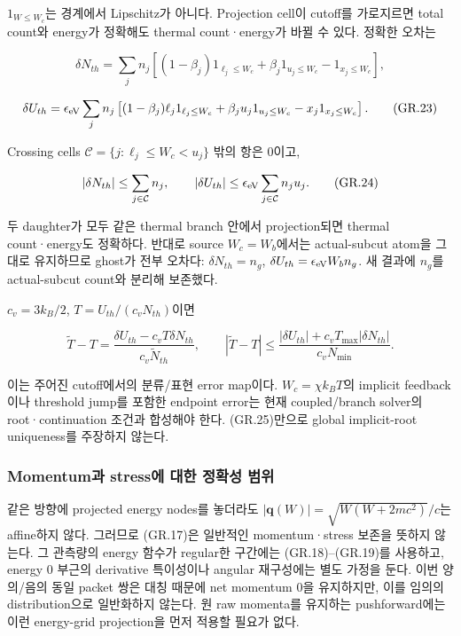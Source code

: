 \(1_{W\le W_c}\)는 경계에서 Lipschitz가 아니다. Projection cell이 cutoff를 가로지르면 total count와 energy가 정확해도 thermal count·energy가 바뀔 수 있다. 정확한 오차는

\[
 \delta N_{th}=\sum_jn_j\left[(1-\beta_j)1_{\ell_j\le W_c}
        +\beta_j1_{u_j\le W_c}-1_{x_j\le W_c}\right],
\tag{GR.22}
\]

\[
 \delta U_{th}=\epsilon_{\rm eV}\sum_jn_j\left[(1-\beta_j)\ell_j1_{\ell_j\le W_c}
        +\beta_ju_j1_{u_j\le W_c}-x_j1_{x_j\le W_c}\right].
\tag{GR.23}
\]

Crossing cells \(\mathcal C=\{j:\ell_j\le W_c<u_j\}\) 밖의 항은 0이고,

\[
 |\delta N_{th}|\le\sum_{j\in\mathcal C}n_j,\qquad
 |\delta U_{th}|\le\epsilon_{\rm eV}\sum_{j\in\mathcal C}n_ju_j.
\tag{GR.24}
\]

두 daughter가 모두 같은 thermal branch 안에서 projection되면 thermal count·energy도 정확하다. 반대로 source \(W_c=W_b\)에서는 actual-subcut atom을 그대로 유지하므로 ghost가 전부 오차다: \(\delta N_{th}=n_g\), \(\delta U_{th}=\epsilon_{\rm eV}W_bn_g\). 새 결과에 \(n_g\)를 actual-subcut count와 분리해 보존했다.

\(c_v=3k_B/2\), \(T=U_{th}/(c_vN_{th})\)이면

\[
 \widetilde T-T=
 \frac{\delta U_{th}-c_vT\delta N_{th}}{c_v\widetilde N_{th}},\qquad
 |\widetilde T-T|\le
 \frac{|\delta U_{th}|+c_vT_{\max}|\delta N_{th}|}{c_vN_{\min}}.
\tag{GR.25}
\]

이는 주어진 cutoff에서의 분류/표현 error map이다. \(W_c=\chi k_BT\)의 implicit feedback이나 threshold jump를 포함한 endpoint error는 현재 coupled/branch solver의 root·continuation 조건과 합성해야 한다. (GR.25)만으로 global implicit-root uniqueness를 주장하지 않는다.

\hypertarget{momentumuxacfc-stressuxc5d0-uxb300uxd55c-uxc815uxd655uxc131-uxbc94uxc704}{%
\subsubsection{Momentum과 stress에 대한 정확성 범위}\label{momentumuxacfc-stressuxc5d0-uxb300uxd55c-uxc815uxd655uxc131-uxbc94uxc704}}

같은 방향에 projected energy nodes를 놓더라도 \(|\mathbf q(W)|=\sqrt{W(W+2mc^2)}/c\)는 affine하지 않다. 그러므로 (GR.17)은 일반적인 momentum·stress 보존을 뜻하지 않는다. 그 관측량의 energy 함수가 regular한 구간에는 (GR.18)--(GR.19)를 사용하고, energy 0 부근의 derivative 특이성이나 angular 재구성에는 별도 가정을 둔다. 이번 양의/음의 동일 packet 쌍은 대칭 때문에 net momentum 0을 유지하지만, 이를 임의의 distribution으로 일반화하지 않는다. 원 raw momenta를 유지하는 pushforward에는 이런 energy-grid projection을 먼저 적용할 필요가 없다.

